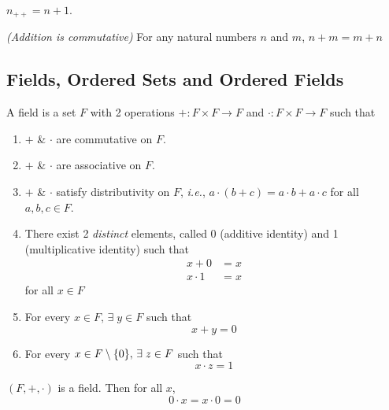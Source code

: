 \documentclass[12pt]{article}
\begin{document}
\begin{cor} \label{thm:N:Tao:S(n)=n+1}
    $n_{++} = n + 1$.
\end{cor}

\begin{prop} \label{thm:N:Tao:addition_is_commutative}
\emph{(Addition is commutative)} For any natural numbers $n$ and $m$, $n + m = m + n$
\end{prop}

\subsection{Fields, Ordered Sets and Ordered Fields}

\begin{defn} \label{defn:field}
    A field is a set $F$ with 2 operations $+ : F \times F \to F$ and $\cdot : F \times F \to F$ such that
    \begin{enumerate}[label=(F\arabic*)]
        \item \label{defn:field:commutativity}
            $+$ \& $\cdot$ are commutative on $F$.
        \item \label{defn:field:associativity}
            $+$ \& $\cdot$ are associative on $F$.
        \item \label{defn:field:distributivity}
            $+$ \& $\cdot$ satisfy distributivity on $F$, \textit{i.e.}, $a \cdot (b + c) = a \cdot b + a \cdot c$ for all $a, b, c \in F$. 
        \item \label{defn:field:identity}
            There exist 2 \emph{distinct} elements, called 0 (additive identity) and 1 (multiplicative identity) such that
            \begin{align*}
                x + 0 &= x \\
                x \cdot 1 &= x
            \end{align*}
            for all $x \in F$
        \item \label{defn:field:negative}
            For every $x \in F, \,\exists\; y \in F$ such that \[
                x + y = 0
            \]
        \item \label{defn:field:reciprocal}
            For every $x \in F \setminus \set{0}, \,\exists\; z \in F$ such that \[
                x \cdot z = 1
            \]
    \end{enumerate}
\end{defn}

\begin{thm} \label{thm:field:0x=0}
    $(F, +, \cdot)$ is a field. Then for all $x$, \[
        0 \cdot x = x \cdot 0 = 0
    \]
\end{thm}
\end{document}
